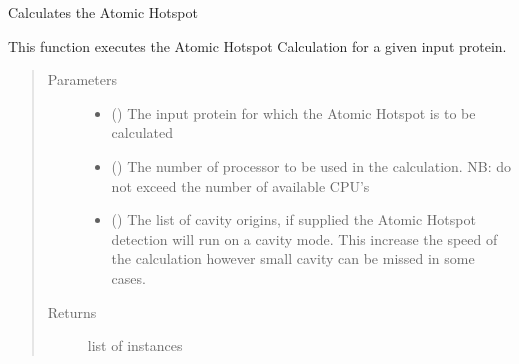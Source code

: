 \documentclass[letterpaper,10pt,english]{sphinxmanual}
\begin{document}
\begin{fulllineitems}
\begin{fulllineitems}
\label{\detokenize{atomic_hotspot_calculation_api:hotspots.atomic_hotspot_calculation.AtomicHotspot.calculate}}
Calculates the Atomic Hotspot

This function executes the Atomic Hotspot Calculation for a given input protein.
\begin{quote}\begin{description}
\item[{Parameters}] \leavevmode\begin{itemize}
\item {} 
 () \textendash{} The input protein for which the Atomic Hotspot is to be calculated

\item {} 
 () \textendash{} The number of processor to be used in the calculation. NB: do not exceed the number of available CPU’s

\item {} 
 () \textendash{} The list of cavity origins, if supplied the Atomic Hotspot detection will run on a cavity mode. This increase the speed of the calculation however small cavity can be missed in some cases.

\end{itemize}

\item[{Returns}] \leavevmode
list of  instances

\end{description}\end{quote}

\begin{sphinxVerbatim}[commandchars=\\\{\}]
   
   
   
\end{sphinxVerbatim}


\end{fulllineitems}
\end{fulllineitems}
\end{document}
